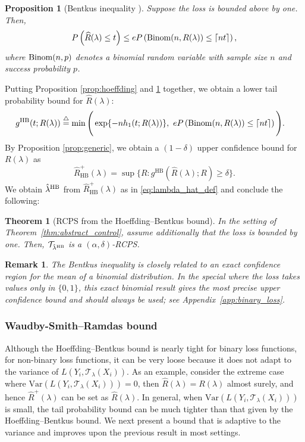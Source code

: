 \documentclass[10pt]{article}
\newtheorem{theorem}{Theorem}
\newtheorem{prop}{Proposition}
\newtheorem{remark}{Remark}
\newcommand{\T}{\mathcal{T}}
\newcommand{\lhat}{\hat{\lambda}}
\newcommand{\Rhat}{\widehat{R}}
\newcommand{\triangleq}{\stackrel{\triangle}{=}}
\begin{document}
\begin{prop}[Bentkus inequality \cite{bentkus2004hoeffding}]\label{prop:bentkus}
Suppose the loss is bounded above by one. Then,
\begin{equation}
P\left( \widehat{R}(\lambda) \le t\right) \le eP\left({\rm Binom}(n,R(\lambda)) \le \lceil nt \rceil\right),
\label{eq:bentkus_bound}
\end{equation}
where ${\rm Binom}(n,p)$ denotes a binomial random variable with sample size $n$ and success probability $p$.
\end{prop}

Putting Proposition \ref{prop:hoeffding} and  \ref{prop:bentkus} together, we obtain a lower tail probability bound for $\Rhat(\lambda)$:
\begin{align}
g^{\mathrm{HB}}(t; R(\lambda)) \triangleq \min\Bigg(& \exp\{-nh_1(t; R(\lambda))\}, \,\, eP\left({\rm Binom}(n,R(\lambda)) \le \lceil nt \rceil\right)\Bigg).\label{eq:HB_g}
\end{align}
By Proposition \ref{prop:generic}, we obtain a $(1 - \delta)$ upper confidence bound for $R(\lambda)$ as 
\begin{equation}\label{eq:Rhat_HB}
\Rhat_{\mathrm{HB}}^+(\lambda) = \sup\Big\{R: g^{\mathrm{HB}}(\Rhat(\lambda); R)\ge \delta\Big\}.
\end{equation}
We obtain $\lhat^{{\rm HB}}$ from $\Rhat_{\mathrm{HB}}^+(\lambda)$ as in \eqref{eq:lambda_hat_def} and conclude the following:
\begin{theorem}[RCPS from the Hoeffding--Bentkus bound]\label{thm:HB}
    In the setting of Theorem~\ref{thm:abstract_control}, assume additionally that the loss is bounded by one. Then, $\T_{\lhat^{{\rm HB}}}$ is a $(\alpha,\delta)$-RCPS.
\end{theorem}

\begin{remark}
 The Bentkus inequality is closely related to an exact confidence region for the mean of a binomial distribution. In the special where the loss takes values only in $\{0,1\}$, this exact binomial result gives the most precise upper confidence bound and should always be used; see Appendix~\ref{app:binary_loss}.
\end{remark}

\subsubsection{Waudby-Smith--Ramdas bound}
Although the Hoeffding--Bentkus bound is nearly tight for binary loss functions, for non-binary loss functions, it can be very loose because it does not adapt to the variance of $L(Y_i, \T_\lambda(X_i))$. As an example, consider the extreme case where $\mathrm{Var}(L(Y_i, \T_\lambda(X_i))) = 0$, then $\widehat{R}(\lambda) = R(\lambda)$ almost surely, and hence $\widehat{R}^+(\lambda)$ can be set as $\widehat{R}(\lambda)$. In general, when $\mathrm{Var}(L(Y_i, \T_\lambda(X_i)))$ is small, the tail probability bound can be much tighter than that given by the Hoeffding--Bentkus bound. We next present a bound that is adaptive to the variance and improves upon the previous result in most settings.
\end{document}
